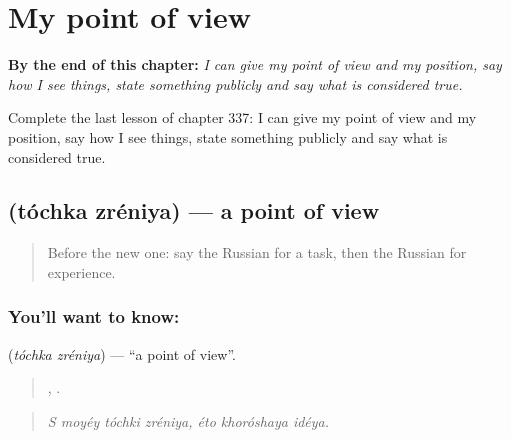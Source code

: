 
\chapter{My point of view}
\label{ch:ru-my-point-of-view}

\begin{chapteropening}
\textbf{By the end of this chapter:} \emph{I can give my point of view and my position, say how I see things, state something publicly and say what is considered true.}

Complete the last lesson of chapter 337: I can give my point of view and my position, say how I see things, state something publicly and say what is considered true.
\end{chapteropening}

\section[\texorpdfstring{\ru{точка} \ru{зрения} (tóchka zréniya)}{точка зрения (tóchka zréniya)}]{  (tóchka zréniya) — a point of view}

\label{lesson:RU-C337-tochka-zreniya}



\begin{quote}
Before the new one: say the Russian for a task, then the Russian for experience.
\end{quote}

\subsection*{You'll want to know:  }
\textbf{ } (\emph{tóchka zréniya}) — \textquotedblleft{}a point of view\textquotedblright{}.

\begin{quote}
   ,   .
\end{quote}

\begin{quote}
\emph{S moyéy tóchki zréniya, éto khoróshaya idéya.}
\end{quote}

